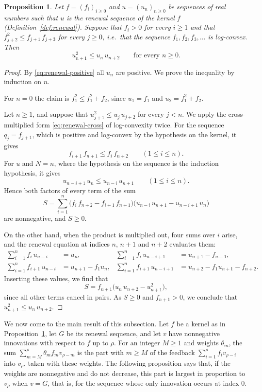 \documentclass{amsart}
\newtheorem{proposition}[theorem]{Proposition}
\theoremstyle{definition}
\theoremstyle{remark}
\numberwithin{equation}{section}
\begin{document}
\begin{proposition}\label{prop:logconvexrenewal}
Let $f=(f_i)_{i\ge 0}$ and $u=(u_n)_{n\ge 0}$ be sequences of real numbers such that $u$ is the renewal sequence of the kernel $f$ (Definition~\ref{def:renewal}). Suppose that $f_i>0$ for every $i\ge 1$ and that $f_{j+2}^2\le f_{j+1}\,f_{j+3}$ for every $j\ge 0$, i.e.\ that the sequence $f_1,f_2,f_3,\dots$ is log-convex. Then
\[
u_{n+1}^2\le u_n\,u_{n+2}\qquad\text{for every } n\ge 0 .
\]
\end{proposition}

\begin{proof}
By \eqref{eq:renewal-positive} all $u_n$ are positive. We prove the inequality by induction on $n$.

For $n=0$ the claim is $f_1^2\le f_1^2+f_2$, since $u_1=f_1$ and $u_2=f_1^2+f_2$.

Let $n\ge 1$, and suppose that $u_{j+1}^2\le u_j\,u_{j+2}$ for every $j<n$. We apply the cross-multiplied form \eqref{eq:renewal-cross} of log-convexity twice. For the sequence $q_j=f_{j+1}$, which is positive and log-convex by the hypothesis on the kernel, it gives
\[
f_{i+1}\,f_{n+1}\le f_i\,f_{n+2}\qquad(1\le i\le n).
\]
For $u$ and $N=n$, where the hypothesis on the sequence is the induction hypothesis, it gives
\[
u_{n-i+1}\,u_n\le u_{n-i}\,u_{n+1}\qquad(1\le i\le n).
\]
Hence both factors of every term of the sum
\[
S=\sum_{i=1}^{n}\bigl(f_i\,f_{n+2}-f_{i+1}\,f_{n+1}\bigr)\bigl(u_{n-i}\,u_{n+1}-u_{n-i+1}\,u_n\bigr)
\]
are nonnegative, and $S\ge 0$.

On the other hand, when the product is multiplied out, four sums over $i$ arise, and the renewal equation at indices $n$, $n+1$ and $n+2$ evaluates them:
\begin{align*}
\sum_{i=1}^{n}f_i\,u_{n-i}&=u_n, & \sum_{i=1}^{n}f_i\,u_{n-i+1}&=u_{n+1}-f_{n+1},\\
\sum_{i=1}^{n}f_{i+1}\,u_{n-i}&=u_{n+1}-f_1u_n, & \sum_{i=1}^{n}f_{i+1}\,u_{n-i+1}&=u_{n+2}-f_1u_{n+1}-f_{n+2}.
\end{align*}
Inserting these values, we find that
\[
S=f_{n+1}\bigl(u_n\,u_{n+2}-u_{n+1}^2\bigr),
\]
since all other terms cancel in pairs. As $S\ge 0$ and $f_{n+1}>0$, we conclude that $u_{n+1}^2\le u_n\,u_{n+2}$.
\end{proof}

We now come to the main result of this subsection. Let $f$ be a kernel as in Proposition~\ref{prop:logconvexrenewal}, let $G$ be its renewal sequence, and let $v$ have nonnegative innovations with respect to $f$ up to $\rho$. For an integer $M\ge 1$ and weights $\theta_m$, the sum $\sum_{m=M}^{\rho}\theta_mf_mv_{\rho-m}$ is the part with $m\ge M$ of the feedback $\sum_{i=1}^{\rho}f_iv_{\rho-i}$ into $v_\rho$, taken with these weights. The following proposition says that, if the weights are nonnegative and do not decrease, this part is largest in proportion to $v_\rho$ when $v=G$, that is, for the sequence whose only innovation occurs at index $0$.
\end{document}
